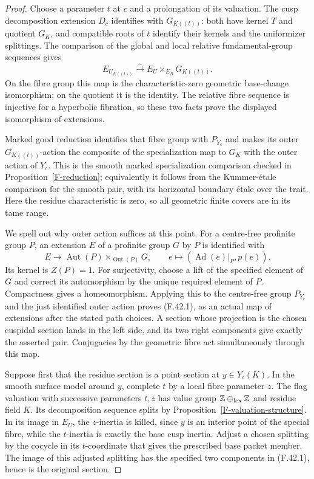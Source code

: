 \begin{proof}
Choose a parameter $t$ at $c$ and a prolongation of its
valuation. The cusp decomposition extension $D_c$ identifies
with $G_{K((t))}$: both have kernel $T$ and quotient $G_K$,
and compatible roots of $t$ identify their kernels and the
uniformizer splittings. The comparison of the global and
local relative fundamental-group sequences gives
\[
 E_{U_{K((t))}}\xrightarrow{\sim}
            E_U\mathbin{\times}_{E_B}G_{K((t))}.
\]
On the fibre group this map is the characteristic-zero
geometric base-change isomorphism; on the quotient it is the
identity. The relative fibre sequence is injective for a
hyperbolic fibration, so these two facts prove the displayed
isomorphism of extensions.

Marked good reduction identifies that fibre group with
$P_{Y_c}$ and makes its outer $G_{K((t))}$-action the
composite of the specialization map to $G_K$ with the
outer action of $Y_c$. This is the smooth marked
specialization comparison checked in
Proposition~\ref{F-reduction}; equivalently it follows from
the Kummer-\'etale comparison for the smooth pair, with
its horizontal boundary \'etale over the trait.
Here the residue characteristic is zero, so all geometric
finite covers are in its tame range.

We spell out why outer action suffices at this point.
For a centre-free profinite group $P$, an extension $E$
of a profinite group $G$ by $P$ is identified with
\[
 E\longrightarrow
 \operatorname{Aut}(P)\mathbin{\times}_{\operatorname{Out}(P)}G,
 \qquad e\longmapsto(\operatorname{Ad}(e)|_P,p(e)).
\]
Its kernel is $Z(P)=1$. For surjectivity, choose a lift of
the specified element of $G$ and correct its automorphism
by the unique required element of $P$. Compactness gives a
homeomorphism. Applying this to the centre-free group
$P_{Y_c}$ and the just identified outer action proves
(F.42.1), as an actual map of extensions after the stated
path choices. A section whose projection is the chosen
cuspidal section lands in the left side, and its two right
components give exactly the asserted pair. Conjugacies by
the geometric fibre act simultaneously through this map.

Suppose first that the residue section is a point section
at $y\in Y_c(K)$. In the smooth surface model around $y$,
complete $t$ by a local fibre parameter $z$. The flag
valuation with successive parameters $t,z$ has value group
$\mathbb Z\oplus_{\rm lex}\mathbb Z$ and residue field
$K$. Its decomposition sequence splits by
Proposition~\ref{F-valuation-structure}. In its image in
$E_U$, the $z$-inertia is killed, since $y$ is an interior
point of the special fibre, while the $t$-inertia is exactly
the base cusp inertia. Adjust a chosen splitting by the
cocycle in its $t$-coordinate that gives the prescribed
base packet member. The image of this adjusted splitting
has the specified two components in (F.42.1), hence is the
original section.


\end{proof}

